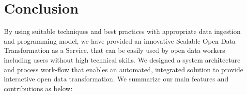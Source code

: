 
\chapter{Conclusion} %
\label{Chapter6} %



By using suitable techniques and best practices with appropriate data ingestion and programming model, we have provided an innovative Scalable Open Data Transformation as a Service, that can be easily used by open data workers including users without high technical skills. We designed a system architecture and process work-flow that enables an automated, integrated solution to provide interactive open data transformation. We summarize our main features and contributions as below:
